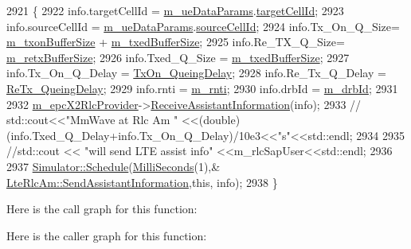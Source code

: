 \begin{DoxyCode}
2921                                                                                \{
2922         info.targetCellId = \hyperlink{classns3_1_1LteRlc_a6f4d5d0a7f8d3dd3c35a5fc0598ea3b8}{m\_ueDataParams}.\hyperlink{structns3_1_1EpcX2Sap_1_1UeDataParams_ae1b898ec9d57743aa53989ef3e30115a}{targetCellId};
2923         info.sourceCellId = \hyperlink{classns3_1_1LteRlc_a6f4d5d0a7f8d3dd3c35a5fc0598ea3b8}{m\_ueDataParams}.\hyperlink{structns3_1_1EpcX2Sap_1_1UeDataParams_aa7874679502767d1cad719fb7dd4a4bb}{sourceCellId};
2924     info.Tx\_On\_Q\_Size= \hyperlink{classns3_1_1LteRlcAm_a3e8db6b5bc1d3fcc215d554e8d347eda}{m\_txonBufferSize} + \hyperlink{classns3_1_1LteRlcAm_add3fe05a0fd3a4ad1fcb7db0239c698f}{m\_txedBufferSize};
2925     info.Re\_TX\_Q\_Size= \hyperlink{classns3_1_1LteRlcAm_af270916ffd1805b027a7b9cc05c91e7d}{m\_retxBufferSize};
2926     info.Txed\_Q\_Size = \hyperlink{classns3_1_1LteRlcAm_add3fe05a0fd3a4ad1fcb7db0239c698f}{m\_txedBufferSize};
2927     info.Tx\_On\_Q\_Delay = \hyperlink{classns3_1_1LteRlcAm_a3f8140197bec7546c991d67f4416c768}{TxOn\_QueingDelay};
2928     info.Re\_Tx\_Q\_Delay = \hyperlink{classns3_1_1LteRlcAm_ad498f40df8e3906dc0e149575aceee0c}{ReTx\_QueingDelay};
2929     info.rnti = \hyperlink{classns3_1_1LteRlc_a48ab0a78e7f2687337075b1c8832df70}{m\_rnti};
2930     info.drbId = \hyperlink{classns3_1_1LteRlc_a34002cd9652c321a6c5279c97cfbe2ad}{m\_drbId};
2931 
2932     \hyperlink{classns3_1_1LteRlc_aa997bbf2807b79443887abd57facd1c8}{m\_epcX2RlcProvider}->\hyperlink{classns3_1_1EpcX2RlcProvider_aac32484a4ef127a3e692e80152fc1219}{ReceiveAssistantInformation}(info);
2933    \textcolor{comment}{// std::cout<<"MmWave at Rlc Am  " <<(double)
       (info.Txed\_Q\_Delay+info.Tx\_On\_Q\_Delay)/10e3<<"s"<<std::endl;}
2934 
2935 \textcolor{comment}{//std::cout << "will send LTE assist info" <<m\_rlcSapUser<<std::endl;}
2936 
2937               \hyperlink{classns3_1_1Simulator_a671882c894a08af4a5e91181bf1eec13}{Simulator::Schedule}(\hyperlink{group__timecivil_gaf26127cf4571146b83a92ee18679c7a9}{MilliSeconds}(1),&
      \hyperlink{classns3_1_1LteRlcAm_a2be4deb8b579e4cc90ed97a0f79f7db7}{LteRlcAm::SendAssistantInformation},\textcolor{keyword}{this}, info);
2938 \}
\end{DoxyCode}


Here is the call graph for this function\+:




Here is the caller graph for this function\+:


